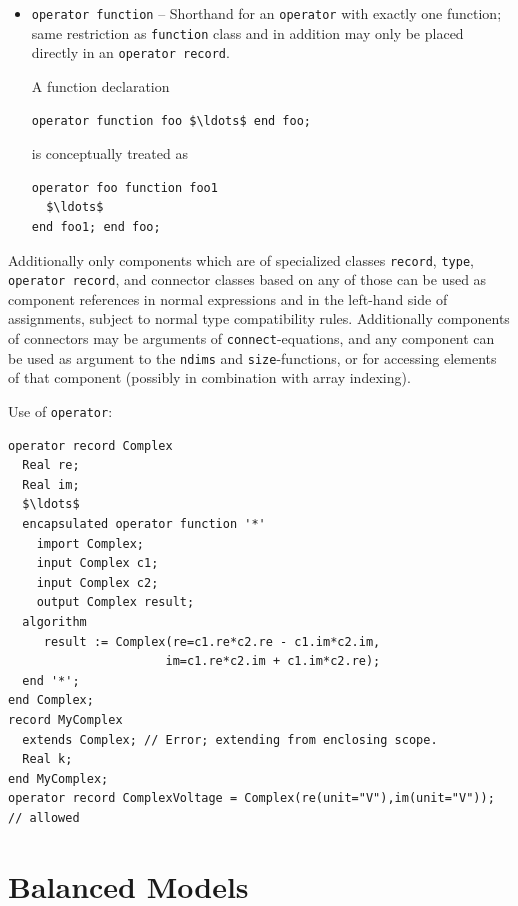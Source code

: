 \begin{itemize}
\item \lstinline!operator function! --
Shorthand for an \lstinline!operator! with exactly one function; same restriction as \lstinline!function! class and in addition may only be placed directly in an \lstinline!operator record!.
\begin{nonnormative}
A function declaration
\begin{lstlisting}[language=modelica]
operator function foo $\ldots$ end foo;
\end{lstlisting}
is conceptually treated as
\begin{lstlisting}[language=modelica]
operator foo function foo1
  $\ldots$
end foo1; end foo;
\end{lstlisting}
\end{nonnormative}

\end{itemize}

Additionally only components which are of specialized classes \lstinline!record!, \lstinline!type!, \lstinline!operator record!, and connector classes based on any of those can be used as component references in normal expressions and in the left-hand side of assignments, subject to normal type compatibility rules.
Additionally components of connectors may be arguments of \lstinline!connect!-equations, and any component can be used as argument to the \lstinline!ndims! and \lstinline!size!-functions, or for accessing elements of that component (possibly in combination with array indexing).

\begin{example}
Use of \lstinline!operator!:
\begin{lstlisting}[language=modelica]
operator record Complex
  Real re;
  Real im;
  $\ldots$
  encapsulated operator function '*'
    import Complex;
    input Complex c1;
    input Complex c2;
    output Complex result;
  algorithm
     result := Complex(re=c1.re*c2.re - c1.im*c2.im,
                      im=c1.re*c2.im + c1.im*c2.re);
  end '*';
end Complex;
record MyComplex
  extends Complex; // Error; extending from enclosing scope.
  Real k;
end MyComplex;
operator record ComplexVoltage = Complex(re(unit="V"),im(unit="V")); // allowed
\end{lstlisting}
\end{example}

\section{Balanced Models}\label{balanced-models}


